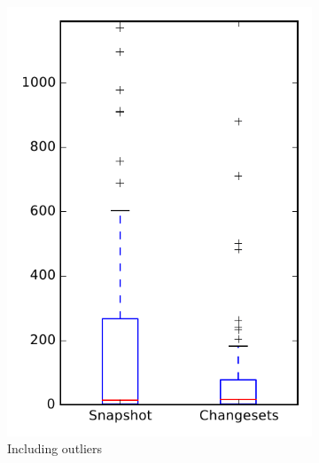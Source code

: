 
\begin{figure}
    \centering
    \begin{subfigure}{.4\textwidth}
        \centering
        \includegraphics[height=0.4\textheight]{figures/flt/rq1_mahout}
        \caption{Including outliers}\label{fig:flt:rq1:mahout_outlier}
    \end{subfigure}%
    \begin{subfigure}{.4\textwidth}
        \centering

\end{subfigure}
\end{figure}
